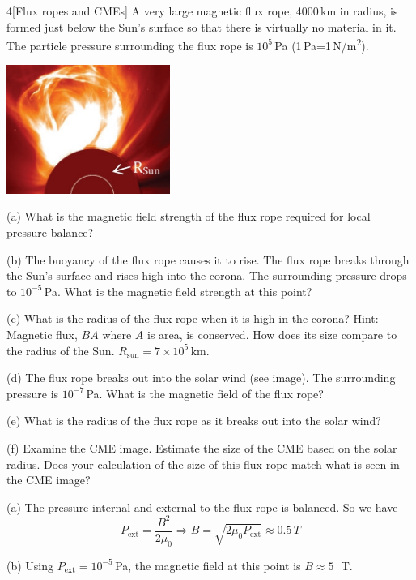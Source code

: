 \documentclass[12pt]{article}
\begin{document}
\begin{problem}{4}[Flux ropes and CMEs]
A very large magnetic flux rope, 4000\,\si{km} in radius, is formed just below
the Sun's surface so that there is virtually no material in it. The particle
pressure surrounding the flux rope is $10^5$\,\si{Pa}
(1\,\si{Pa}=1\,\si{N/m\tothe{2}}).

\begin{center}
    \includegraphics[width=0.4\textwidth]{hw4_p4.jpg} 
\end{center}

(a) What is the magnetic field strength of the flux rope required for local
pressure balance?

(b) The buoyancy of the flux rope causes it to rise. The flux rope breaks
through the Sun's surface and rises high into the corona. The surrounding
pressure drops to $10^{-5}$\,\si{Pa}. What is the magnetic field strength at
this point?

(c) What is the radius of the flux rope when it is high in the corona? Hint:
Magnetic flux, $BA$ where $A$ is area, is conserved. How does its size compare
to the radius of the Sun. $R_{\text{sun}}=7\times 10^5$\,\si{km}.

(d) The flux rope breaks out into the solar wind (see image). The surrounding
pressure is $10^{-7}$\,\si{Pa}. What is the magnetic field of the flux rope?

(e) What is the radius of the flux rope as it breaks out into the solar wind?

(f) Examine the CME image. Estimate the size of the CME based on the solar
radius. Does your calculation of the size of this flux rope match what is seen
in the CME image?
\begin{solution}
(a) The pressure internal and external to the flux rope is balanced. So we have
\begin{equation}
    P_{\text{ext}}=\frac{B^2}{2\mu_0}
    \Rightarrow
    B=\sqrt{2\mu_0P_\text{ext}}
    \approx0.5\,\si{T}
\end{equation}

(b) Using $P_{\text{ext}}=10^{-5}$\,\si{Pa}, the magnetic field at this point is
$B\approx 5$\,\si{\mu T}.


\end{solution}
\end{problem}
\end{document}
